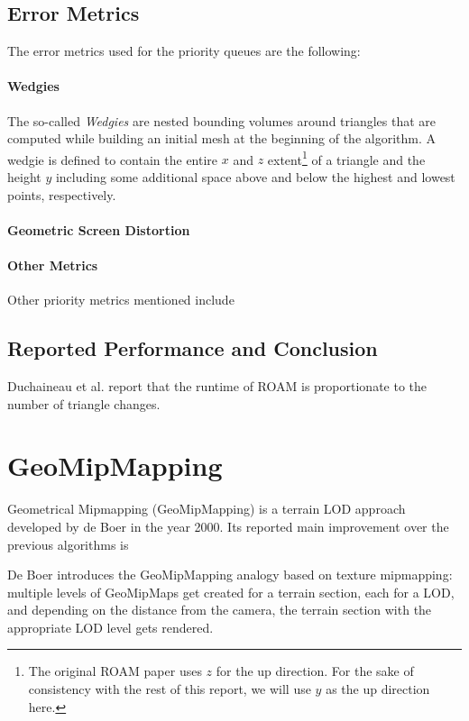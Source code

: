 \subsection{Error Metrics}
The error metrics used for the priority queues are the following:

\paragraph{Wedgies} The so-called \textit{Wedgies} are nested bounding volumes around triangles that are computed 
while building an initial mesh at the beginning of the algorithm.
A wedgie is defined to contain the entire $x$ and $z$ extent\footnote{The original ROAM paper uses $z$ for the up direction. For the sake of consistency with the rest of this report, we will use $y$ as the up direction here.}
of a triangle and the height $y$ including some additional space above and below the highest and lowest points,
respectively.

\paragraph{Geometric Screen Distortion}

\paragraph{Other Metrics} Other priority metrics mentioned include 

\subsection{Reported Performance and Conclusion}
Duchaineau et al. report that the runtime of ROAM is proportionate to the 
number of triangle changes.


\section{GeoMipMapping}
Geometrical Mipmapping (GeoMipMapping) is a terrain LOD approach developed by de Boer \cite{geomipmapping} in the year 2000.
Its reported main improvement over the previous algorithms is 

De Boer introduces the GeoMipMapping analogy based on texture mipmapping: multiple levels of 
GeoMipMaps get created for a terrain section, each for a LOD, and depending on the distance
from the camera, the terrain section with the appropriate LOD level gets rendered.




